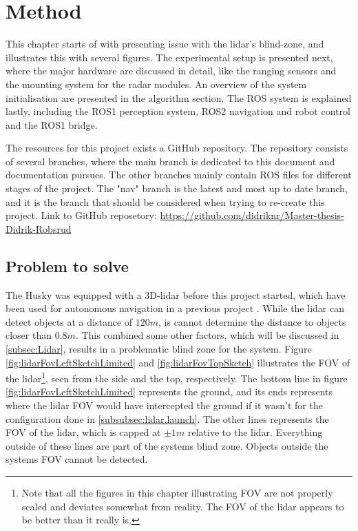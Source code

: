 
\chapter{Method}\label{chap:Method}
This chapter starts of with presenting issue with the lidar's blind-zone, and illustrates this with several figures. The experimental setup is presented next, where the major hardware are discussed in detail, like the ranging sensors and the mounting system for the radar modules. An overview of the system initialisation are presented in the algorithm section. The ROS system is explained lastly, including the ROS1 perception system, ROS2 navigation and robot control and the ROS1 bridge.

The resources for this project exists a GitHub repository. The repository consists of several branches, where the main branch is dedicated to this document and documentation pursues. The other branches mainly contain ROS files for different stages of the project. The "nav" branch is the latest and most up to date branch, and it is the branch that should be considered when trying to re-create this project. Link to GitHub reposetory: \url{https://github.com/didriknr/Master-thesis-Didrik-Robsrud}

\section{Problem to solve}%
The Husky was equipped with a 3D-lidar before this project started, which have been used for autonomous navigation in a previous project \cite{uia_husky_0776}. While the lidar can detect objects at a distance of $120 m$, is cannot determine the distance to objects closer than $0.8m$. This combined some other factors, which will be discussed in \ref{subsec:Lidar}, results in a problematic blind zone for the system. Figure \ref{fig:lidarFovLeftSketchLimited} and \ref{fig:lidarFovTopSketch} illustrates the FOV of the lidar\footnote{Note that all the figures in this chapter illustrating FOV are not properly scaled and deviates somewhat from reality. The FOV of the lidar appears to be better than it really is.}, seen from the side and the top, respectively. The bottom line in figure \ref{fig:lidarFovLeftSketchLimited} represents the ground, and its ends represents where the lidar FOV would have intercepted the ground if it wasn't for the configuration done in \ref{subsubsec:lidar.launch}. The other lines represents the FOV of the lidar, which is capped at $\pm 1 m$ relative to the lidar. Everything outside of these lines are part of the systems blind zone. Objects outside the systems FOV cannot be detected. 

